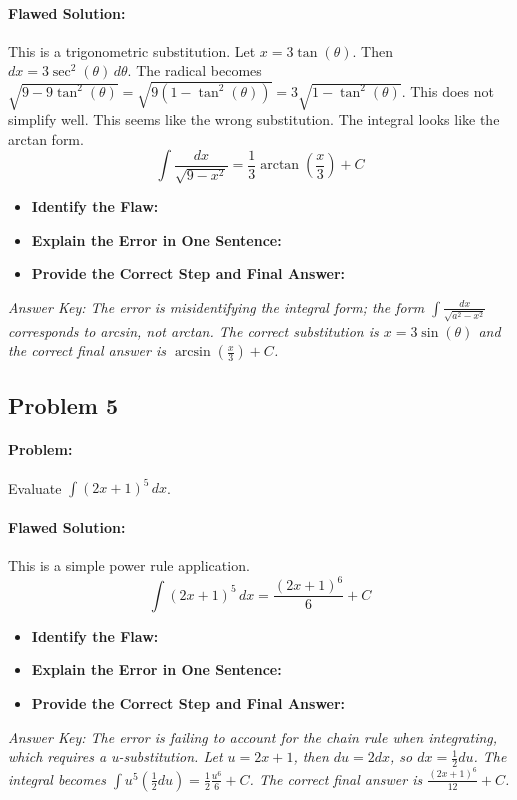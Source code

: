 \documentclass{article}
\begin{document}
\paragraph{Flawed Solution:}
This is a trigonometric substitution. Let $x = 3\tan(\theta)$.
Then $dx = 3\sec^2(\theta) \, d\theta$.
The radical becomes $\sqrt{9 - 9\tan^2(\theta)} = \sqrt{9(1-\tan^2(\theta))} = 3\sqrt{1-\tan^2(\theta)}$. This does not simplify well. This seems like the wrong substitution.
The integral looks like the arctan form.
\[ \int \frac{dx}{\sqrt{9-x^2}} = \frac{1}{3}\arctan\left(\frac{x}{3}\right) + C \]
\begin{itemize}
    \item \textbf{Identify the Flaw:}
    \item \textbf{Explain the Error in One Sentence:}
    \item \textbf{Provide the Correct Step and Final Answer:}
\end{itemize}
\textit{Answer Key: The error is misidentifying the integral form; the form $\int \frac{dx}{\sqrt{a^2-x^2}}$ corresponds to arcsin, not arctan. The correct substitution is $x=3\sin(\theta)$ and the correct final answer is $\arcsin(\frac{x}{3}) + C$.}

\subsection{Problem 5}
\paragraph{Problem:} Evaluate $\int (2x+1)^5 \, dx$.
\paragraph{Flawed Solution:}
This is a simple power rule application.
\[ \int (2x+1)^5 \, dx = \frac{(2x+1)^6}{6} + C \]
\begin{itemize}
    \item \textbf{Identify the Flaw:}
    \item \textbf{Explain the Error in One Sentence:}
    \item \textbf{Provide the Correct Step and Final Answer:}
\end{itemize}
\textit{Answer Key: The error is failing to account for the chain rule when integrating, which requires a u-substitution. Let $u=2x+1$, then $du=2dx$, so $dx = \frac{1}{2}du$. The integral becomes $\int u^5 (\frac{1}{2}du) = \frac{1}{2}\frac{u^6}{6} + C$. The correct final answer is $\frac{(2x+1)^6}{12} + C$.}
\end{document}

